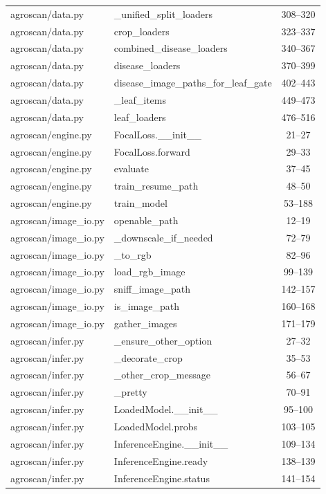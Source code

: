 \begin{center}
\begin{longtable}{@{}p{4.6cm}p{5.2cm}c@{}}
agroscan/data.py & \_unified\_split\_loaders & 308--320 \\
agroscan/data.py & crop\_loaders & 323--337 \\
agroscan/data.py & combined\_disease\_loaders & 340--367 \\
agroscan/data.py & disease\_loaders & 370--399 \\
agroscan/data.py & disease\_image\_paths\_for\_leaf\_gate & 402--443 \\
agroscan/data.py & \_leaf\_items & 449--473 \\
agroscan/data.py & leaf\_loaders & 476--516 \\
agroscan/engine.py & FocalLoss.\_\_init\_\_ & 21--27 \\
agroscan/engine.py & FocalLoss.forward & 29--33 \\
agroscan/engine.py & evaluate & 37--45 \\
agroscan/engine.py & train\_resume\_path & 48--50 \\
agroscan/engine.py & train\_model & 53--188 \\
agroscan/image\_io.py & openable\_path & 12--19 \\
agroscan/image\_io.py & \_downscale\_if\_needed & 72--79 \\
agroscan/image\_io.py & \_to\_rgb & 82--96 \\
agroscan/image\_io.py & load\_rgb\_image & 99--139 \\
agroscan/image\_io.py & sniff\_image\_path & 142--157 \\
agroscan/image\_io.py & is\_image\_path & 160--168 \\
agroscan/image\_io.py & gather\_images & 171--179 \\
agroscan/infer.py & \_ensure\_other\_option & 27--32 \\
agroscan/infer.py & \_decorate\_crop & 35--53 \\
agroscan/infer.py & \_other\_crop\_message & 56--67 \\
agroscan/infer.py & \_pretty & 70--91 \\
agroscan/infer.py & LoadedModel.\_\_init\_\_ & 95--100 \\
agroscan/infer.py & LoadedModel.probs & 103--105 \\
agroscan/infer.py & InferenceEngine.\_\_init\_\_ & 109--134 \\
agroscan/infer.py & InferenceEngine.ready & 138--139 \\
agroscan/infer.py & InferenceEngine.status & 141--154 \\

\end{longtable}
\end{center}
